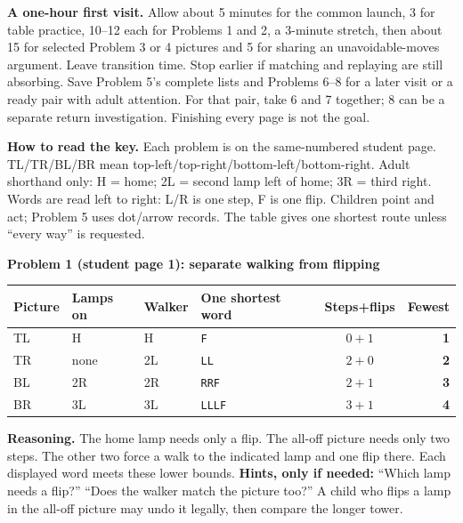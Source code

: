\documentclass[11pt]{article}
\makeatletter
\newcommand{\sub}[1]{\par\textbf{#1}\par}
\newcommand{\keyrow}[8]{#2 & #3 & #4 & \texttt{#5} & $#6+#7$ & \textbf{#8}\\}
\newenvironment{keytable}{\par\smallskip\begingroup\small\setlength{\tabcolsep}{7pt}\renewcommand{\arraystretch}{1.15}\begin{tabular}{@{}llllcr@{}}\textbf{Picture}&\textbf{Lamps on}&\textbf{Walker}&\textbf{One shortest word}&\textbf{Steps+flips}&\textbf{Fewest}\\\midrule}{\end{tabular}\endgroup\par\smallskip}
\makeatother
\begin{document}
\textbf{A one-hour first visit.} Allow about 5 minutes for the common launch, 3 for table practice, 10--12 each for Problems 1 and 2, a 3-minute stretch, then about 15 for selected Problem 3 or 4 pictures and 5 for sharing an unavoidable-moves argument. Leave transition time. Stop earlier if matching and replaying are still absorbing. Save Problem 5's complete lists and Problems 6--8 for a later visit or a ready pair with adult attention. For that pair, take 6 and 7 together; 8 can be a separate return investigation. Finishing every page is not the goal.

\textbf{How to read the key.} Each problem is on the same-numbered student page. TL/TR/BL/BR mean top-left/top-right/bottom-left/bottom-right. Adult shorthand only: H = home; 2L = second lamp left of home; 3R = third right. Words are read left to right: L/R is one step, F is one flip. Children point and act; Problem 5 uses dot/arrow records. The table gives one shortest route unless ``every way'' is requested.

\sub{Problem 1 (student page 1): separate walking from flipping}
\begin{keytable}
\keyrow{1TL}{TL}{H}{H}{F}{0}{1}{1}
\keyrow{1TR}{TR}{none}{2L}{LL}{2}{0}{2}
\keyrow{1BL}{BL}{2R}{2R}{RRF}{2}{1}{3}
\keyrow{1BR}{BR}{3L}{3L}{LLLF}{3}{1}{4}
\end{keytable}
\textbf{Reasoning.} The home lamp needs only a flip. The all-off picture needs only two steps. The other two force a walk to the indicated lamp and one flip there. Each displayed word meets these lower bounds.
\textbf{Hints, only if needed:} ``Which lamp needs a flip?'' ``Does the walker match the picture too?'' A child who flips a lamp in the all-off picture may undo it legally, then compare the longer tower.
\end{document}
